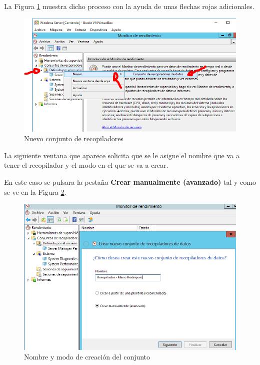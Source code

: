 	La Figura \ref{fig:figura9} muestra dicho proceso con la ayuda de unas flechas rojas adicionales.
	
	\begin{figure}[H] %
		\centering
		\includegraphics[scale=0.7]{figuras/figura9.png} 
		\caption{Nuevo conjunto de recopiladores} 
		\label{fig:figura9}
	\end{figure}

	La siguiente ventana que aparece solicita que se le asigne el nombre que va a tener el recopilador y el modo en el que se va a crear. 
	
	En este caso se pulsara la pestaña \textbf{Crear manualmente (avanzado)} tal y como se ve en la Figura \ref{fig:figura10}.
	
	\begin{figure}[H] %
		\centering
		\includegraphics[scale=0.55]{figuras/figura10.png} 
		\caption{Nombre y modo de creación del conjunto} 
		\label{fig:figura10}
	\end{figure}
	
